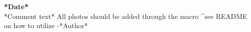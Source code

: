 \textbf{*Date*}\\
*Comment text*
All photos should be added through the \insertimage[]{} macro
^see README on how to utilize
-*Author*\\
~\ %